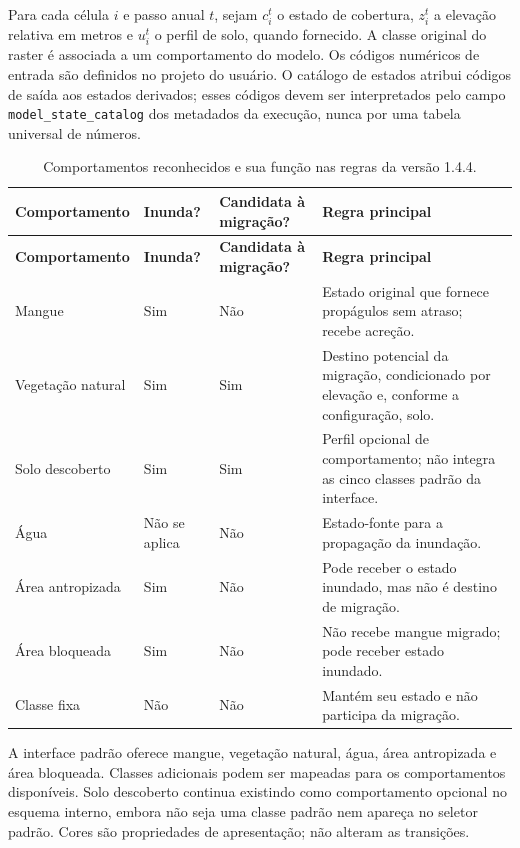 \documentclass[11pt,a4paper]{article}
\begin{document}
Para cada célula $i$ e passo anual $t$, sejam $c_i^t$ o estado de cobertura, $z_i^t$ a elevação relativa em metros e $u_i^t$ o perfil de solo, quando fornecido. A classe original do raster é associada a um comportamento do modelo. Os códigos numéricos de entrada são definidos no projeto do usuário. O catálogo de estados atribui códigos de saída aos estados derivados; esses códigos devem ser interpretados pelo campo \texttt{model\_state\_catalog} dos metadados da execução, nunca por uma tabela universal de números.

\begin{longtable}{P{3.2cm}P{2.5cm}P{4.3cm}P{4.0cm}}
\caption{Comportamentos reconhecidos e sua função nas regras da versão 1.4.4.}\\
\toprule
\textbf{Comportamento} & \textbf{Inunda?} & \textbf{Candidata à migração?} & \textbf{Regra principal}\\
\midrule
\endfirsthead
\toprule
\textbf{Comportamento} & \textbf{Inunda?} & \textbf{Candidata à migração?} & \textbf{Regra principal}\\
\midrule
\endhead
Mangue & Sim & Não & Estado original que fornece propágulos sem atraso; recebe acreção.\\
Vegetação natural & Sim & Sim & Destino potencial da migração, condicionado por elevação e, conforme a configuração, solo.\\
Solo descoberto & Sim & Sim & Perfil opcional de comportamento; não integra as cinco classes padrão da interface.\\
Água & Não se aplica & Não & Estado-fonte para a propagação da inundação.\\
Área antropizada & Sim & Não & Pode receber o estado inundado, mas não é destino de migração.\\
Área bloqueada & Sim & Não & Não recebe mangue migrado; pode receber estado inundado.\\
Classe fixa & Não & Não & Mantém seu estado e não participa da migração.\\
\bottomrule
\end{longtable}

A interface padrão oferece mangue, vegetação natural, água, área antropizada e área bloqueada. Classes adicionais podem ser mapeadas para os comportamentos disponíveis. Solo descoberto continua existindo como comportamento opcional no esquema interno, embora não seja uma classe padrão nem apareça no seletor padrão. Cores são propriedades de apresentação; não alteram as transições.
\end{document}
